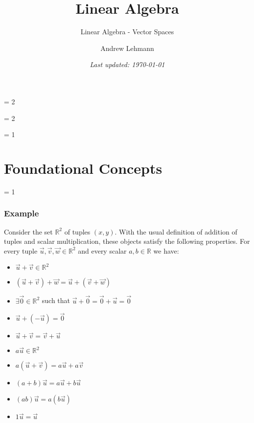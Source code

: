 \documentclass[usenames,dvipsnames,aspectratio=169,10pt]{beamer}
\def \EXAMPLEVERSION {1} %
\def \SCHOOLVERSION {1} %
\numberwithin{equation}{section}
\begin{document}
\title{Linear Algebra}
\subtitle{Linear Algebra - Vector Spaces}
\author{Andrew Lehmann}
\ifnum \SCHOOLVERSION = 2
\fi
\date{\textit{Last updated: \today}}

\ifnum \SCHOOLVERSION = 2
\fi


\begin{frame}
\titlepage
\end{frame}




\ifnum \EXAMPLEVERSION = 1
\section{Foundational Concepts}
\fi


\ifnum \EXAMPLEVERSION = 1
\begin{frame}
\frametitle{Example}

Consider the set $\mathbb{R}^2$ of tuples $(x,y)$. With the usual definition of addition of tuples and scalar multiplication, these objects satisfy the following properties. For every tuple $\vec{u},\vec{v},\vec{w} \in \mathbb{R}^2$ and every scalar $a,b\in\mathbb{R}$ we have:

\begin{minipage}{0.57\textwidth}
\begin{itemize}
\item $\vec{u}+\vec{v} \in \mathbb{R}^2$
\item $\left(\vec{u}+\vec{v}\right) +\vec{w} = \vec{u}+\left(\vec{v} +\vec{w}\right)$
\item $\exists \vec{0}\in\mathbb{R}^2$ such that $\vec{u}+\vec{0}=\vec{0}+\vec{u}=\vec{0}$
\item $\vec{u}+(-\vec{u})=\vec{0}$
\item $\vec{u}+\vec{v} = \vec{v}+\vec{u}$
\end{itemize}
\end{minipage}\hfill
\begin{minipage}{0.43\textwidth}
\begin{itemize}
\item $a\vec{u} \in \mathbb{R}^2$
\item $a\left(\vec{u}+\vec{v}\right) = a\vec{u}+a\vec{v}$
\item $\left(a+b\right)\vec{u} = a\vec{u}+b\vec{u}$
\item $\left(ab\right)\vec{u} = a\left(b\vec{u}\right)$
\item $1\vec{u}=\vec{u}$
\end{itemize}
\end{minipage}

\end{frame}
\end{document}
